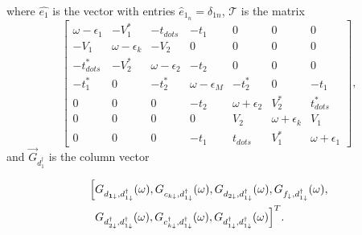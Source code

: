 \documentclass[showpacs,aps,prb,reprint,superscriptaddress]{revtex4-2}
\begin{document}
\noindent where $\hat{e_1}$ is the vector with entries  $\hat{e}_{1_n} =\delta_{1n}$, $\mathcal{T}$ is the  matrix 
\begin{equation}
\left[\begin{array}{ccccccc}
\omega-\epsilon_{1} & -V_{1}^{*} & -t_{dots} & -t_{1} & 0 & 0 & 0\\
-V_{1} & \omega-\epsilon_{k} & -V_{2} & 0 & 0 & 0 & 0\\
-t_{dots}^{*} & -V_{2}^{*} & \omega-\epsilon_{2} & -t_{2} & 0 & 0 & 0\\
-t_{1}^{*} & 0 & -t_{2}^{*} & \omega-\epsilon_{M} & -t_{2}^{*} & 0 & -t_{1}\\
0 & 0 & 0 & -t_{2} & \omega+\epsilon_{2} & V_{2}^{*} & t_{dots}^{*}\\
0 & 0 & 0 & 0 & V_{2} & \omega+\epsilon_{k} & V_{1}\\
0 & 0 & 0 & -t_{1} & t_{dots} & V_{1}^{*} & \omega+\epsilon_{1}
\end{array}\right],
\label{eq:TransportMatrix}
\end{equation}
 \noindent  and $\vec{G}_{d^\dagger_1}$  is the column vector
 
 \begin{align*}
    \Big[ &  G_{d_{\mathbf{1\downarrow}},d_{1\downarrow}^{\dagger}}(\omega),G_{c_{k\downarrow},d_{1\downarrow}^{\dagger}}(\omega),G_{d_{2\downarrow},d_{1\downarrow}^{\dagger}}(\omega),G_{f_{\downarrow},  d_{1\downarrow}^{\dagger}}(\omega), \\ & G_{d_{2\downarrow}^{\dagger},d_{1\downarrow}^{\dagger}}(\omega),G_{c_{k\downarrow}^{\dagger},d_{1\downarrow}^{\dagger}}(\omega),G_{d_{1\downarrow}^{\dagger},d_{1\downarrow}^{\dagger}}(\omega) \Big]^T.
 \end{align*}
 
 
\end{document}
